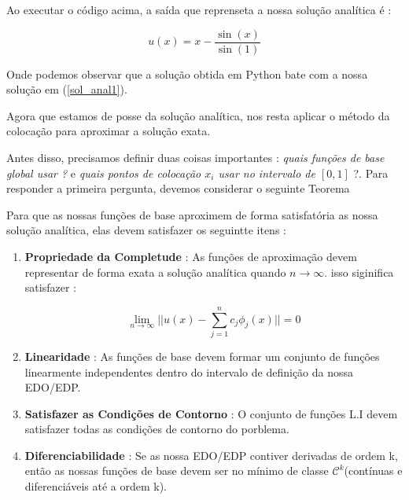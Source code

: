 \documentclass[a4paper, 12pt]{article}
\numberwithin{equation}{section}
\begin{document}
Ao executar o código acima, a saída que reprenseta a nossa solução analítica é : 

\begin{tcolorbox}[colback=gray!10!white, colframe=blue!40!black, title={ Saída do Código}]
 $$u(x) = x - \frac{\sin(x)}{\sin(1)}$$
\end{tcolorbox}

Onde podemos observar que a solução obtida em Python bate com a nossa solução em (\ref{sol_anal1}). 

Agora que estamos de posse da solução analítica, nos resta aplicar o método da colocação para  aproximar a solução exata.

Antes disso, precisamos definir duas coisas importantes : \textit{quais funções de base global usar ?} e \textit{quais pontos de colocação $x_i$ usar no intervalo de $[0,1]$ }?. 
Para responder a primeira pergunta, devemos considerar o seguinte Teorema 

\begin{tcolorbox}[colback=gray!10!white, colframe=green!40!black, title={ Teorema das Funções de Bases Globais }]
Para que as nossas funções de base aproximem de forma satisfatória as nossa solução analítica, elas devem satisfazer os seguintte itens : 

\begin{enumerate}
    \item \textbf{Propriedade da Completude} : As funções de aproximação devem representar de forma exata a solução analítica quando $n \longrightarrow \infty$. isso siginifica satisfazer : 

    \begin{equation*}
        \lim_{n \longrightarrow \infty}  \Big|\Big| u(x) - \sum_{j = 1}^{n}c_j \phi_j(x) \Big|\Big| = 0 
    \end{equation*}

    \item \textbf{Linearidade} : As funções de base devem formar um conjunto de funções linearmente independentes dentro do intervalo de definição da nossa EDO/EDP. 

    \item \textbf{Satisfazer as Condições de Contorno} : O conjunto de funções L.I devem satisfazer todas as condições de contorno do porblema. 

    \item  \textbf{Diferenciabilidade} : Se as nossa EDO/EDP contiver derivadas de ordem k, então as nossas funções de base devem ser no mínimo de classe $\mathcal{C}^{k}$(contínuas e diferenciáveis até a ordem k). 
\end{enumerate}

\end{tcolorbox}
\end{document}
